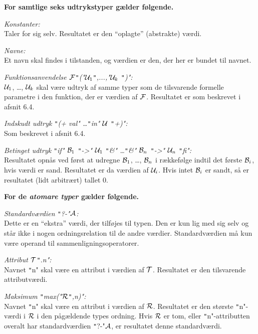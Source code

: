 \documentclass{article}
\newcounter{eks}
\begin{document}
{\bf For samtlige seks udtrykstyper g\ae{}lder f\o{}lgende.}

{\em Konstanter:}\\
Taler for sig selv. Resultatet er den ``oplagte'' (abstrakte) v\ae{}rdi.

{\em Navne:}\\
Et navn skal findes i tilstanden, og v\ae{}rdien er den,
der her er bundet til navnet.

{\em Funktionsanvendelse $\cal F$\texttt"("${\cal U}_1$\texttt",...,"${\cal U}_k$
\texttt")":}\\
${\cal U}_1$, \ldots, ${\cal U}_k$ skal v\ae{}re udtryk af samme typer
som de tilsvarende formelle parametre i den funktion, der er
v\ae{}rdien af $\cal F$. Resultatet er som beskrev\-et i afsnit 6.4.

{\em Indskudt udtryk \texttt"(+ val" \ldots \texttt"in" $\cal U$ \texttt"+)":}\\
Som beskrevet i afsnit 6.4.

{\em Betinget udtryk \texttt"if" ${\cal B}_1$ \texttt"->" ${\cal U}_1$
\texttt"&" \ldots \texttt"&" ${\cal B}_n$ \texttt"->" ${\cal U}_n$ \texttt"fi":}\\
Resultatet opn\aa{}s ved f\o{}rst at udregne ${\cal B}_1$, \ldots,
${\cal B}_n$ i r\ae{}kkef\o{}lge indtil det f\o{}rste ${\cal B}_i$,
hvis v\ae{}rdi er sand. Resultatet er da v\ae{}rdien af
${\cal U}_i$. Hvis intet ${\cal B}_i$ er sandt, s\aa{} er resultatet
(lidt arbitr\ae{}rt) tallet 0.

{\bf For de {\em atomare typer\/} g\ae{}lder f\o{}lgende.}

{\em Standardv\ae{}rdien \texttt"?-"$\cal A$:}\\
Dette er en ``ekstra'' v\ae{}rdi, der tilf\o{}jes til typen.
Den er kun lig med sig selv og st\aa{}r ikke i nogen ordningsrelation
til de andre v\ae{}rdier. Standardv\ae{}rdien m\aa{} kun v\ae{}re
operand til sammenligningsoperatorer.

{\em Attribut $\cal T$\texttt".n":}\\
Navnet \texttt"n" skal v\ae{}re en attribut i v\ae{}rdien af $\cal T$.
Resultatet er den til\-svar\-en\-de attributv\ae{}rdi.

{\em Maksimum \texttt"max("$\cal R$\texttt",n)":}\\
Navnet \texttt"n" skal v\ae{}re en attribut i v\ae{}rdien af $\cal R$.
Resultatet er den st\o{}rste \texttt"n"-v\ae{}rdi i $\cal R$ i den
p\aa{}g\ae{}ldende types ordning. Hvis $\cal R$ er tom, eller
\texttt"n"-attributten overalt har standardv\ae{}rdien \texttt"?-"$\cal A$,
er resultatet denne standardv\ae{}rdi.
\end{document}

